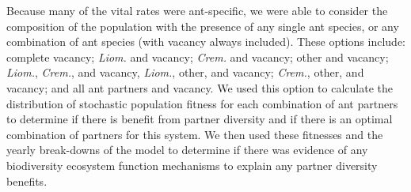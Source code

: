\documentclass[12pt,a4paper]{article}
\begin{document}
		Because many of the vital rates were ant-specific, we were able to consider the composition of the population with the presence of any single ant species, or any combination of ant species (with vacancy always included).
		These options include: complete vacancy; \textit{Liom.} and vacancy; \textit{Crem.} and vacancy; other and vacancy; \textit{Liom.}, \textit{Crem.}, and vacancy, \textit{Liom.}, other, and vacancy; \textit{Crem.}, other, and vacancy; and all ant partners and vacancy.
		We used this option to calculate the distribution of stochastic population fitness for each combination of ant partners to determine if there is benefit from partner diversity and if there is an optimal combination of partners for this system. 
		We then used these fitnesses and the yearly break-downs of the model to determine if there was evidence of any biodiversity ecosystem function mechanisms to explain any partner diversity benefits. 
		
\end{document}
